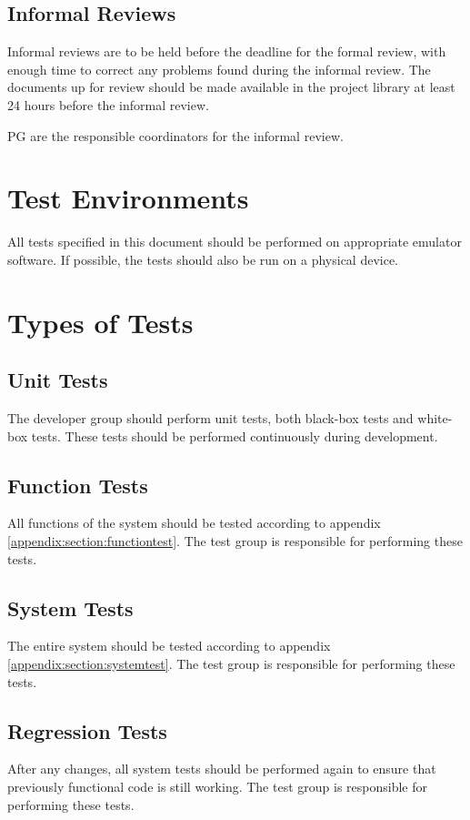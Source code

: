 \documentclass[a4paper]{article}
\begin{document}
\subsection{Informal Reviews}
Informal reviews are to be held before the deadline for the formal review, with enough time to correct any problems found during the informal review. The documents up for review should be made available in the project library at least 24 hours before the informal review.

PG are the responsible coordinators for the informal review.

\section{Test Environments}
All tests specified in this document should be performed on appropriate emulator software. If possible, the tests should also be run on a physical device.

\section{Types of Tests}

\subsection{Unit Tests}
The developer group should perform unit tests, both black-box tests and white-box tests. These tests should be performed continuously during development.

\subsection{Function Tests}
All functions of the system should be tested according to appendix \ref{appendix:section:functiontest}. The test group is responsible for  performing these tests.

\subsection{System Tests}
The entire system should be tested according to appendix \ref{appendix:section:systemtest}. The test group is responsible for performing these tests. 

\subsection{Regression Tests}
After any changes, all system tests should be performed again to ensure that previously functional code is still working. The test group is responsible for performing these tests.
\end{document}
